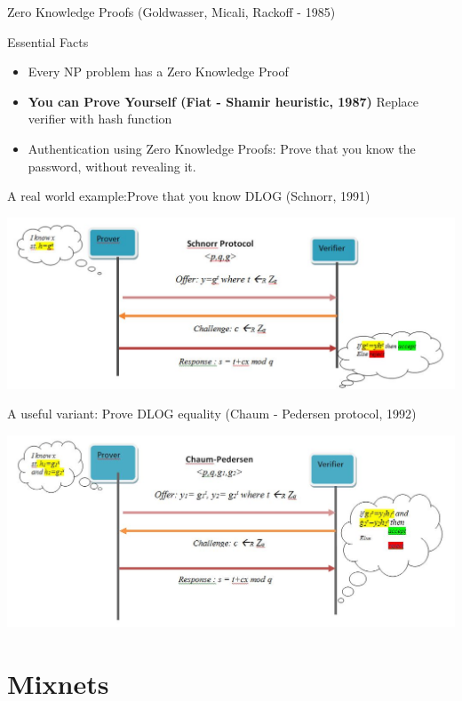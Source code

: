 \documentclass{beamer}
\begin{document}
\begin{frame}[allowframebreaks]{Zero Knowledge Proofs (Goldwasser, Micali, Rackoff - 1985)}
\begin{block}{Essential Facts}
\begin{itemize}
\item Every NP problem has a Zero Knowledge Proof
\item \textbf{You can Prove Yourself (Fiat - Shamir heuristic, 1987)} Replace verifier with hash function
\item Authentication using Zero Knowledge Proofs: Prove that you know the password, without revealing it.
\end{itemize} 
\end{block}

\framebreak 
A real world example:Prove that you know DLOG (Schnorr, 1991)
\begin{center}
\includegraphics[scale=0.40]{schnorr.jpg}
\end{center}

\framebreak 
A useful variant: Prove DLOG equality (Chaum - Pedersen protocol, 1992)
\begin{center}
\includegraphics[scale=0.35]{chaumpedersen.jpg}
\end{center}

\end{frame}


\section{Mixnets}
\end{document}
